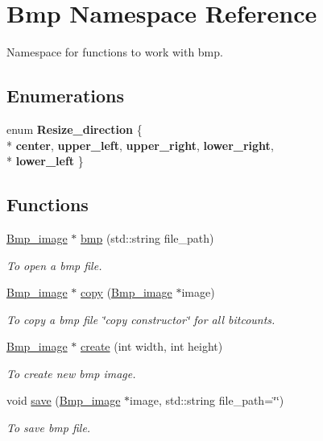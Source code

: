 \hypertarget{namespaceBmp}{}\section{Bmp Namespace Reference}
\label{namespaceBmp}


Namespace for functions to work with bmp.  


\subsection*{Enumerations}
\begin{DoxyCompactItemize}
\item 
enum {\bfseries Resize\+\_\+direction} \{ \\*
{\bfseries center}, 
{\bfseries upper\+\_\+left}, 
{\bfseries upper\+\_\+right}, 
{\bfseries lower\+\_\+right}, 
\\*
{\bfseries lower\+\_\+left}
 \}\hypertarget{namespaceBmp_a17aedbe2a7f4fccdb8542a417187eea7}{}\label{namespaceBmp_a17aedbe2a7f4fccdb8542a417187eea7}

\end{DoxyCompactItemize}
\subsection*{Functions}
\begin{DoxyCompactItemize}
\item 
\hyperlink{classBmp__image}{Bmp\+\_\+image} $\ast$ \hyperlink{namespaceBmp_a0516017b061918b7c396d5a85a356d80}{bmp} (std\+::string file\+\_\+path)
\begin{DoxyCompactList}\small\item\em To open a bmp file. \end{DoxyCompactList}\item 
\hyperlink{classBmp__image}{Bmp\+\_\+image} $\ast$ \hyperlink{namespaceBmp_a8ddbb8d2fcb9df1522415088eae7e53f}{copy} (\hyperlink{classBmp__image}{Bmp\+\_\+image} $\ast$image)
\begin{DoxyCompactList}\small\item\em To copy a bmp file \char`\"{}copy constructor\char`\"{} for all bitcounts. \end{DoxyCompactList}\item 
\hyperlink{classBmp__image}{Bmp\+\_\+image} $\ast$ \hyperlink{namespaceBmp_a9f54637816ad1d1be6a5f700af19fb4d}{create} (int width, int height)
\begin{DoxyCompactList}\small\item\em To create new bmp image. \end{DoxyCompactList}\item 
void \hyperlink{namespaceBmp_a98d314a663fc3a6fe51b76d0e4a4811c}{save} (\hyperlink{classBmp__image}{Bmp\+\_\+image} $\ast$image, std\+::string file\+\_\+path=\char`\"{}\char`\"{})
\begin{DoxyCompactList}\small\item\em To save bmp file. \end{DoxyCompactList}\end{DoxyCompactItemize}



